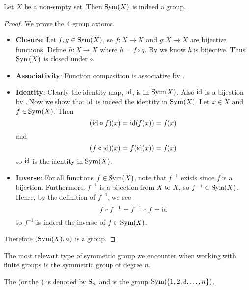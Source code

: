 \begin{proposition}
    Let $X$ be a non-empty set. Then $\mathrm{Sym}(X)$ is indeed a group.
\end{proposition}
\begin{proof}
    We prove the 4 group axioms.
    \begin{itemize}
        \item \textbf{Closure}: Let $f, g \in \mathrm{Sym}(X)$, so $f: X\to X$ and $g:X \to X$ are bijective functions. Define $h:X \to X$ where $h = f\circ g$. By  we know $h$ is bijective. Thus $\mathrm{Sym}(X)$ is closed under $\circ$.

        \item \textbf{Associativity}: Function composition is associative by .

        \item \textbf{Identity}: Clearly the identity map, $\mathrm{id}$, is in $\mathrm{Sym}(X)$. Also $\mathrm{id}$ is a bijection by . Now we show that $\mathrm{id}$ is indeed the identity in $\mathrm{Sym}(X)$. Let $x \in X$ and $f \in \mathrm{Sym}(X)$. Then
        \[
            (\mathrm{id} \circ f)(x) = \mathrm{id}(f(x)) = f(x)
        \]
        and
        \[
            (f \circ \mathrm{id})(x) = f(\mathrm{id}(x)) = f(x)
        \]
        so $\mathrm{id}$ is the identity in $\mathrm{Sym}(X)$.

        \item \textbf{Inverse}: For all functions $f \in \mathrm{Sym}(X)$, note that $f^{-1}$ exists since $f$ is a bijection. Furthermore, $f^{-1}$ is a bijection from $X$ to $X$, so $f^{-1} \in \mathrm{Sym}(X)$. Hence, by the definition of $f^{-1}$, we see
        \[
            f \circ f^{-1} = f^{-1} \circ f = \mathrm{id}
        \]
        so $f^{-1}$ is indeed the inverse of $f \in \mathrm{Sym}(X)$.
    \end{itemize}
    Therefore $(\mathrm{Sym}(X), \circ)$ is a group.
\end{proof}

The most relevant type of symmetric group we encounter when working with finite groups is the symmetric group of degree $n$.

\begin{definition}
    The  (or the ) is denoted by $\mathrm{S}_{n}$ and is the group $\mathrm{Sym}(\{1, 2, 3, \dots, n\})$.
\end{definition}

